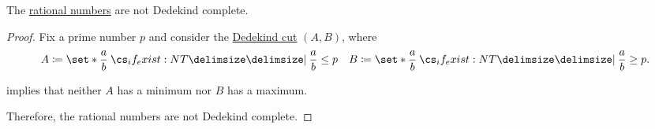 \begin{proposition}\label{thm:rational_numbers_not_dedekind_complete}
  The \hyperref[def:rational_numbers]{rational numbers} are not Dedekind complete.
\end{proposition}
\begin{proof}
  Fix a prime number \( p \) and consider the \hyperref[def:dedekind_cut]{Dedekind cut} \( (A, B) \), where
  \begin{align*}
    A \coloneqq \set*{ \frac a b \given* \frac a b \leq p }
    &&
    B \coloneqq \set*{ \frac a b \given* \frac a b \geq p }.
  \end{align*}

   implies that neither \( A \) has a minimum nor \( B \) has a maximum.

  Therefore, the rational numbers are not Dedekind complete.
\end{proof}
